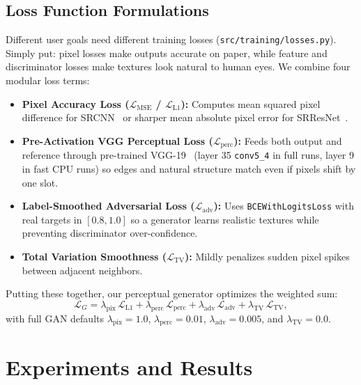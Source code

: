 \documentclass[10pt,onecolumn,journal]{IEEEtran}
\begin{document}
\subsection{Loss Function Formulations}
Different user goals need different training losses (\texttt{src/training/losses.py}). Simply put: pixel losses make outputs accurate on paper, while feature and discriminator losses make textures look natural to human eyes. We combine four modular loss terms:
\begin{itemize}
    \item \textbf{Pixel Accuracy Loss ($\mathcal{L}_{\mathrm{MSE}}$ / $\mathcal{L}_{\mathrm{L1}}$):} Computes mean squared pixel difference for SRCNN~\cite{dong2016srcnn} or sharper mean absolute pixel error for SRResNet~\cite{lim2017edsr}.
    \item \textbf{Pre-Activation VGG Perceptual Loss ($\mathcal{L}_{\mathrm{perc}}$):} Feeds both output and reference through pre-trained VGG-19~\cite{simonyan2015vgg} (layer 35 \texttt{conv5\_4} in full runs, layer 9 in fast CPU runs) so edges and natural structure match even if pixels shift by one slot.
    \item \textbf{Label-Smoothed Adversarial Loss ($\mathcal{L}_{\mathrm{adv}}$):} Uses \texttt{BCEWithLogitsLoss} with real targets in $[0.8, 1.0]$ so a generator learns realistic textures while preventing discriminator over-confidence.
    \item \textbf{Total Variation Smoothness ($\mathcal{L}_{\mathrm{TV}}$):} Mildly penalizes sudden pixel spikes between adjacent neighbors.
\end{itemize}
Putting these together, our perceptual generator optimizes the weighted sum:
\begin{equation}
\mathcal{L}_{G} = \lambda_{\mathrm{pix}}\,\mathcal{L}_{\mathrm{L1}} + \lambda_{\mathrm{perc}}\,\mathcal{L}_{\mathrm{perc}} + \lambda_{\mathrm{adv}}\,\mathcal{L}_{\mathrm{adv}} + \lambda_{\mathrm{TV}}\,\mathcal{L}_{\mathrm{TV}},
\label{eq:gan_loss}
\end{equation}
with full GAN defaults $\lambda_{\mathrm{pix}} = 1.0$, $\lambda_{\mathrm{perc}} = 0.01$, $\lambda_{\mathrm{adv}} = 0.005$, and $\lambda_{\mathrm{TV}} = 0.0$.

\clearpage
\section{Experiments and Results}
\end{document}
